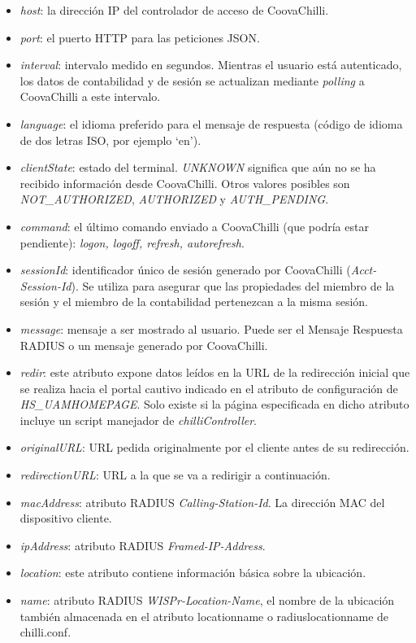 \begin{itemize}
\item \emph{host}: la dirección IP del controlador de acceso de CoovaChilli.
\item \emph{port}: el puerto HTTP para las peticiones JSON.
\item \emph{interval}: intervalo medido en segundos. Mientras el usuario está autenticado, los datos de contabilidad y de sesión se actualizan mediante \emph{polling} a CoovaChilli a este intervalo.
\item \emph{language}: el idioma preferido para el mensaje de respuesta (código de idioma de dos letras ISO, por ejemplo ‘en’).
\item \emph{clientState}: estado del terminal. \emph{UNKNOWN} significa que aún no se ha recibido información desde CoovaChilli. Otros valores posibles son \emph{NOT\_AUTHORIZED}, \emph{AUTHORIZED} y \emph{AUTH\_PENDING}.
\item \emph{command}: el último comando enviado a CoovaChilli (que podría estar pendiente): \emph{logon, logoff, refresh, autorefresh}.
\item \emph{sessionId}: identificador único de sesión generado por CoovaChilli (\emph{Acct-Session-Id}). Se utiliza para asegurar que las propiedades del miembro de la sesión y el miembro de la contabilidad pertenezcan a la misma sesión.
\item \emph{message}: mensaje a ser mostrado al usuario. Puede ser el Mensaje Respuesta RADIUS o un mensaje generado por CoovaChilli.
\item \emph{redir}: este atributo expone datos leídos en la URL de la redirección inicial que se realiza hacia el portal cautivo indicado en el atributo de configuración de \emph{HS\_UAMHOMEPAGE}. Solo existe si la página especificada en dicho atributo incluye un script manejador de \emph{chilliController}.
\item \emph{originalURL}: URL pedida originalmente por el cliente antes de su redirección.
\item \emph{redirectionURL}: URL a la que se va a redirigir a continuación.
\item \emph{macAddress}: atributo RADIUS \emph{Calling-Station-Id}. La dirección MAC del dispositivo cliente.
\item \emph{ipAddress}: atributo RADIUS \emph{Framed-IP-Address}.
\item \emph{location}: este atributo contiene información básica sobre la ubicación.
\item \emph{name}: atributo RADIUS \emph{WISPr-Location-Name}, el nombre de la ubicación también almacenada en el atributo locationname o radiuslocationname de chilli.conf.

\end{itemize}
